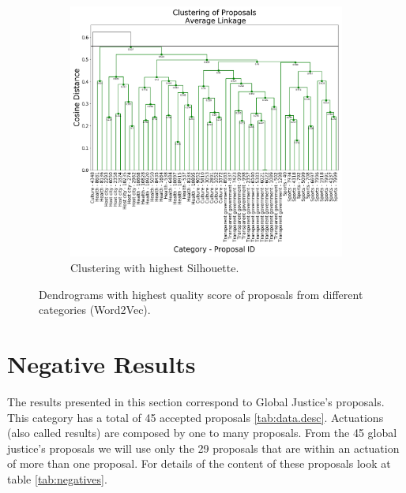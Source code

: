\begin{figure}[!htpb]
\begin{subfigure}[b]{0.59\textwidth}
  \includegraphics[width=\textwidth]{word2vec/BEST_SIL_MIX.png}
  \caption[]%
  {{\small Clustering with highest Silhouette.}}    
  \label{fig:mix.word2vec.sil}
  \end{subfigure}
\caption{Dendrograms with highest quality score of proposals from different categories (Word2Vec).}
\label{fig:mix.word2vec.dendro}
\end{figure}
    
\FloatBarrier



\FloatBarrier
\section{Negative Results}

The results presented in this section correspond to Global Justice's proposals. This category has a total of 45 accepted proposals \ref{tab:data.desc}. Actuations (also called results) are composed by one to many proposals. From the 45 global justice's proposals we will use only the 29 proposals that are within an actuation of more than one proposal. For details of the content of these proposals look at table \ref{tab:negatives}.


